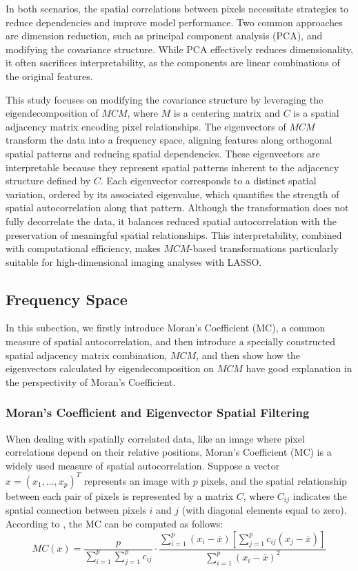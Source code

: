 \documentclass[12pt]{article}
\begin{document}
In both scenarios, the spatial correlations between pixels necessitate strategies to reduce dependencies and improve model performance. Two common approaches are dimension reduction, such as principal component analysis (PCA), and modifying the covariance structure. While PCA effectively reduces dimensionality, it often sacrifices interpretability, as the components are linear combinations of the original features.

This study focuses on modifying the covariance structure by leveraging the eigendecomposition of \( MCM \), where \( M \) is a centering matrix and \( C \) is a spatial adjacency matrix encoding pixel relationships. The eigenvectors of \( MCM \) transform the data into a frequency space, aligning features along orthogonal spatial patterns and reducing spatial dependencies. These eigenvectors are interpretable because they represent spatial patterns inherent to the adjacency structure defined by \( C \). Each eigenvector corresponds to a distinct spatial variation, ordered by its associated eigenvalue, which quantifies the strength of spatial autocorrelation along that pattern. Although the transformation does not fully decorrelate the data, it balances reduced spatial autocorrelation with the preservation of meaningful spatial relationships. This interpretability, combined with computational efficiency, makes \( MCM \)-based transformations particularly suitable for high-dimensional imaging analyses with LASSO.


\subsection{Frequency Space}

In this subection, we firstly introduce Moran's Coefficient (MC), a common measure of spatial autocorrelation, and then introduce a specially constructed spatial adjacency matrix combination, \( M C M \), and then show how the eigenvectors calculated by eigendecomposition on \( M C M \) have good explanation in the perspectivity of Moran's Coefficient.

\subsubsection{Moran's Coefficient and Eigenvector Spatial Filtering}

When dealing with spatially correlated data, like an image where pixel correlations depend on their relative positions, Moran’s Coefficient (MC) is a widely used measure of spatial autocorrelation. Suppose a vector \( x = (x_1, \ldots, x_p)^T \) represents an image with \( p \) pixels, and the spatial relationship between each pair of pixels is represented by a matrix \( C \), where \( C_{ij} \) indicates the spatial connection between pixels \( i \) and \( j \) (with diagonal elements equal to zero). According to \citet{griffith2014spatial}, the MC can be computed as follows:
\[
M C(x) = \frac{p}{\sum_{i=1}^p \sum_{j=1}^p c_{ij}} \cdot \frac{\sum_{i=1}^p \left(x_i - \bar{x} \right) \left[ \sum_{j=1}^p c_{ij} \left( x_j - \bar{x} \right) \right]}{\sum_{i=1}^p \left( x_i - \bar{x} \right)^2}
\]
\end{document}
